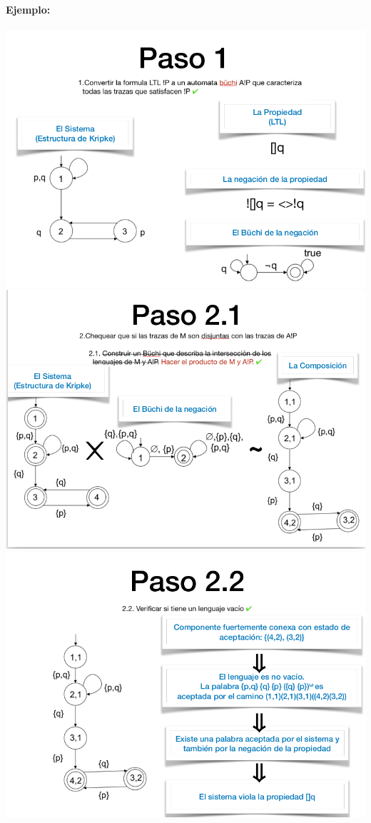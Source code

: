 \paragraph{Ejemplo:}
\begin{center}
    \includegraphics[scale=0.375]{imagenes/paso1.png}
    \includegraphics[scale=0.375]{imagenes/paso2.png}
    \includegraphics[scale=0.375]{imagenes/paso2-2.png}
\end{center}

